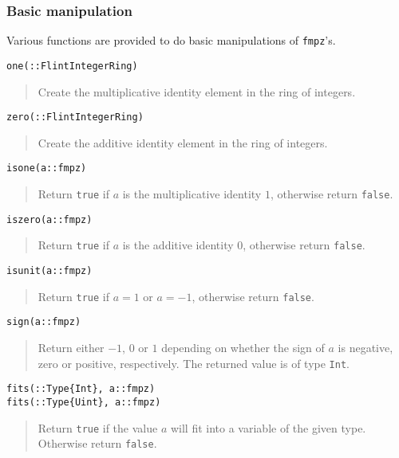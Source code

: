 \documentclass[a4paper,10pt]{article}
\newcommand{\code}{\lstinline}
\newcommand{\desc}[1]{\vspace{-3mm}\begin{quote}#1\end{quote}}
\begin{document}
\subsubsection{Basic manipulation}

Various functions are provided to do basic manipulations of \code{fmpz}'s.

\begin{lstlisting}
one(::FlintIntegerRing)
\end{lstlisting}

\desc{Create the multiplicative identity element in the ring of integers.}

\begin{lstlisting}
zero(::FlintIntegerRing)
\end{lstlisting}

\desc{Create the additive identity element in the ring of integers.}

\begin{lstlisting}
isone(a::fmpz)
\end{lstlisting}

\desc{Return \code{true} if $a$ is the multiplicative identity $1$, otherwise
return \code{false}.}

\begin{lstlisting}
iszero(a::fmpz)
\end{lstlisting}

\desc{Return \code{true} if $a$ is the additive identity $0$, otherwise
return \code{false}.}

\begin{lstlisting}
isunit(a::fmpz)
\end{lstlisting}

\desc{Return \code{true} if $a = 1$ or $a = -1$, otherwise return \code{false}.}

\begin{lstlisting}
sign(a::fmpz)
\end{lstlisting}

\desc{Return either $-1$, $0$ or $1$ depending on whether the sign of $a$ is negative,
zero or positive, respectively. The returned value is of type \code{Int}.}

\begin{lstlisting}
fits(::Type{Int}, a::fmpz)
fits(::Type{Uint}, a::fmpz)
\end{lstlisting}

\desc{Return \code{true} if the value $a$ will fit into a variable of the given
type. Otherwise return \code{false}.}
\end{document}
